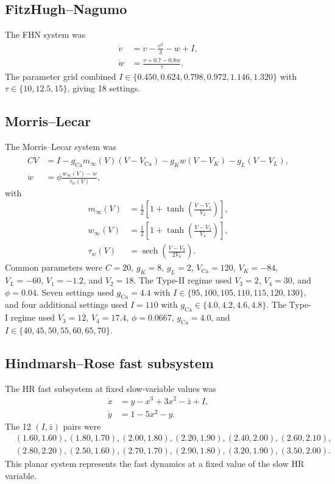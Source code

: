 \documentclass[11pt]{article}
\begin{document}
\subsection{FitzHugh--Nagumo}
The FHN system was
\begin{align}
\dot v &= v-\frac{v^3}{3}-w+I,\\
\dot w &= \frac{v+0.7-0.8w}{\tau}.
\end{align}
The parameter grid combined $I\in\{0.450,0.624,0.798,0.972,1.146,1.320\}$ with $\tau\in\{10,12.5,15\}$, giving 18 settings.

\subsection{Morris--Lecar}
The Morris--Lecar system was
\begin{align}
C\dot V &= I-g_{\mathrm{Ca}}m_\infty(V)(V-V_{\mathrm{Ca}})-g_Kw(V-V_K)-g_L(V-V_L),\\
\dot w &= \phi\frac{w_\infty(V)-w}{\tau_w(V)},
\end{align}
with
\begin{align}
m_\infty(V)&=\frac12\left[1+\tanh\left(\frac{V-V_1}{V_2}\right)\right],\\
w_\infty(V)&=\frac12\left[1+\tanh\left(\frac{V-V_3}{V_4}\right)\right],\\
\tau_w(V)&=\operatorname{sech}\left(\frac{V-V_3}{2V_4}\right).
\end{align}
Common parameters were $C=20$, $g_K=8$, $g_L=2$, $V_{\mathrm{Ca}}=120$, $V_K=-84$, $V_L=-60$, $V_1=-1.2$, and $V_2=18$. The Type-II regime used $V_3=2$, $V_4=30$, and $\phi=0.04$. Seven settings used $g_{\mathrm{Ca}}=4.4$ with $I\in\{95,100,105,110,115,120,130\}$, and four additional settings used $I=110$ with $g_{\mathrm{Ca}}\in\{4.0,4.2,4.6,4.8\}$. The Type-I regime used $V_3=12$, $V_4=17.4$, $\phi=0.0667$, $g_{\mathrm{Ca}}=4.0$, and $I\in\{40,45,50,55,60,65,70\}$.

\subsection{Hindmarsh--Rose fast subsystem}
The HR fast subsystem at fixed slow-variable values was
\begin{align}
\dot x &= y-x^3+3x^2-\bar z+I,\\
\dot y &= 1-5x^2-y.
\end{align}
The 12 $(I,\bar z)$ pairs were
\begin{equation*}
\begin{split}
&(1.60,1.60),(1.80,1.70),(2.00,1.80),(2.20,1.90),(2.40,2.00),(2.60,2.10),\\
&(2.80,2.20),(2.50,1.60),(2.70,1.70),(2.90,1.80),(3.20,1.90),(3.50,2.00).
\end{split}
\end{equation*}
This planar system represents the fast dynamics at a fixed value of the slow HR variable.
\end{document}
